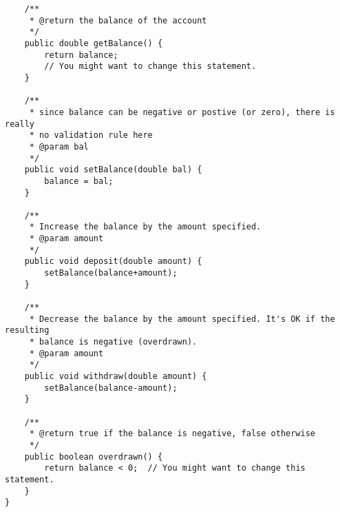\begin{questions}
\begin{solution}
\begin{lstlisting}
	/**
	 * @return the balance of the account
	 */
	public double getBalance() {
		return balance;  
		// You might want to change this statement.
	}
	
	/**
	 * since balance can be negative or postive (or zero), there is really 
	 * no validation rule here
	 * @param bal
	 */
	public void setBalance(double bal) {
		balance = bal;
	}

	/**
	 * Increase the balance by the amount specified.
	 * @param amount
	 */
	public void deposit(double amount) {
		setBalance(balance+amount);
	}

	/**
	 * Decrease the balance by the amount specified. It's OK if the resulting
	 * balance is negative (overdrawn).
	 * @param amount
	 */
	public void withdraw(double amount) {
		setBalance(balance-amount);
	}

	/**
	 * @return true if the balance is negative, false otherwise
	 */
	public boolean overdrawn() {
		return balance < 0;  // You might want to change this statement.
	}
}
\end{lstlisting}
\end{solution}
\end{questions}

